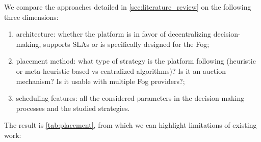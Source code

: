 We compare the approaches detailed in \cref{sec:literature_review} on the following three dimensions:
\begin{enumerate}[(1)]
	\item architecture: whether the platform is in favor of decentralizing decision-making, supports \glspl{SLA} or is specifically designed for the Fog;
	\item placement method: what type of strategy is the platform following (heuristic or meta-heuristic based vs centralized algorithms)? Is it an auction mechanism? Is it usable with multiple Fog providers?;
	\item scheduling features: all the considered parameters in the decision-making processes and the studied strategies.
\end{enumerate}
The result is \cref{tab:placement}, from which we can highlight limitations of existing work:

